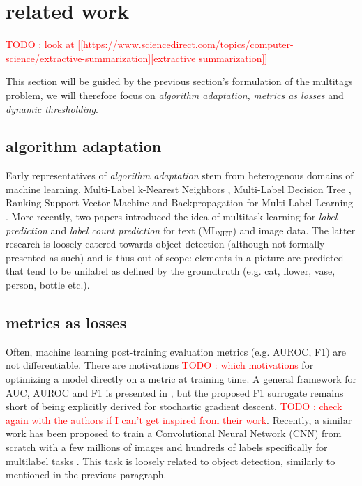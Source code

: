 \documentclass[sigconf,natbib,screen=true,review=true,anonymous]{acmart}
\newcommand\todo[1]{\textcolor{red}{TODO : #1}}
\begin{document}

\section{related work}
\label{sec:orgfe89773}

\todo{look at [[https://www.sciencedirect.com/topics/computer-science/extractive-summarization][extractive summarization]]}

This section will be guided by the previous section's formulation of the multitags problem, we will therefore focus on \emph{algorithm adaptation}, \emph{metrics as losses} and \emph{dynamic thresholding}.

\subsection{algorithm adaptation}
\label{sec:orga72c80c}

Early representatives of \emph{algorithm adaptation} stem from heterogenous domains of machine learning. Multi-Label k-Nearest Neighbors \cite{ML-KNN}, Multi-Label Decision Tree \cite{ML-DT}, Ranking Support Vector Machine \cite{multilabelSVM} and Backpropagation for Multi-Label Learning \cite{multilabelBackprop}. More recently, two papers introduced the idea of multitask learning for \emph{label prediction} and \emph{label count prediction} for text (ML\(_{\text{NET}}\)) \cite{multitaskLabel} and image \cite{multitaskLabelImages} data. The latter research is loosely catered towards object detection (although not formally presented as such) and is thus out-of-scope: elements in a picture are predicted that tend to be unilabel as defined by the groundtruth (e.g. cat, flower, vase, person, bottle etc.).

\subsection{metrics as losses}
\label{sec:org14bc58c}

Often, machine learning post-training evaluation metrics (e.g. AUROC, F1) are not differentiable. There are motivations \todo{which motivations} for optimizing a model directly on a metric at training time. A general framework for AUC, AUROC and F1 is presented in \cite{optimizableLosses}, but the proposed F1 surrogate remains short of being explicitly derived for stochastic gradient descent. \todo{check again with the authors if I can't get inspired from their work}. Recently, a similar work has been proposed to train a Convolutional Neural Network (CNN) from scratch with a few millions of images and hundreds of labels specifically for multilabel tasks \cite{tencent}. This task is loosely related to object detection, similarly to \cite{multitaskLabelImages} mentioned in the previous paragraph.
\end{document}
